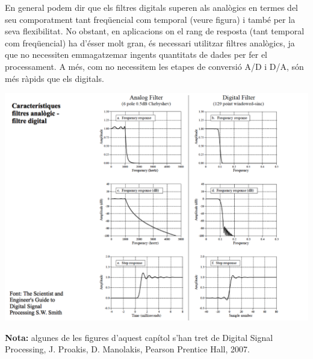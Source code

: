 \documentclass{article}
\begin{document}
En general podem dir que els filtres digitals superen als analògics en termes del seu comporatment 
tant freqüencial com temporal (veure figura) i també per la seva flexibilitat. No obstant, en aplicacions on el rang 
de resposta (tant temporal com freqüencial) ha d'ésser molt gran, és necessari utilitzar filtres analògics,
ja que no necessiten emmagatzemar ingents quantitats de dades per fer el processament. 
A més, com no necessitem les etapes de conversió A/D i D/A, són més ràpids que els digitals.
 
\begin{center}
\includegraphics[width=15cm]{caranalogicdigital.png}
\end{center}



\vskip 7cm
\noindent
\textbf{Nota:} algunes de les figures d'aquest cap\'itol s'han tret de Digital Signal Processing, J. Proakis, D. Manolakis, Pearson Prentice Hall, 2007.
\end{document}
